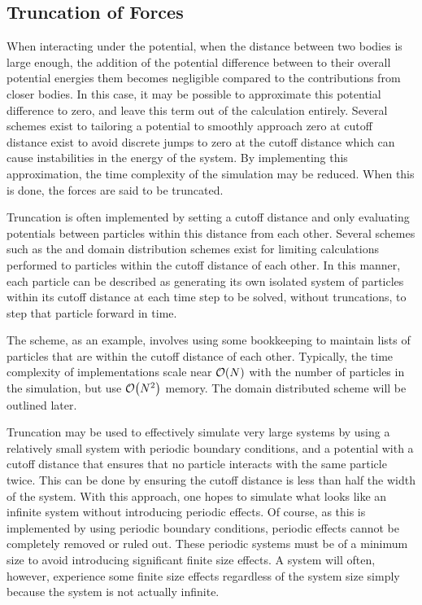 \subsection{Truncation of Forces}

%
When interacting under the \LennardJones{} potential,
when the distance between two bodies is large enough,
the addition of the potential difference between to their overall
potential energies them becomes negligible compared
to the contributions from closer bodies.
%
In this case, it may be possible to approximate this potential difference
to zero, and leave this term out of the calculation entirely.
%
Several schemes exist to tailoring a potential to smoothly approach zero at
cutoff distance exist to avoid discrete jumps to zero at
the cutoff distance which can cause instabilities
in the energy of the system.
%
By implementing this approximation,
the time complexity of the simulation may be reduced.
%
When this is done, the forces are said to be truncated.

%
Truncation is often implemented by
setting a cutoff distance and only evaluating potentials
between particles within this distance from each other.
%
Several schemes such as the \verletlist{} and domain distribution
schemes exist for limiting calculations performed to
particles within the cutoff distance of each other.
%
In this manner, each particle can be described as generating its own
isolated system of particles within its cutoff distance
at each time step
to be solved, without truncations, to step that particle forward in time.

The \verletlist{} scheme, as an example, involves using some bookkeeping to
maintain lists of particles that are within the cutoff distance of each other.
%
Typically, the time complexity of \verletlist{} implementations scale
near $\mathcal{O}{\left({ N }\right)}$ with
the number of particles in the simulation,
but use $\mathcal{O}{\left({ N^2 }\right)}$ memory.
%
The domain distributed scheme will be outlined later.

%
Truncation may be used to effectively simulate very large systems by using
a relatively small system with periodic boundary conditions,
and a potential with a cutoff distance that ensures that
no particle interacts with the same particle twice.
%
This can be done by ensuring the cutoff distance is less than half the width
of the system.
%
With this approach, one hopes to simulate what looks like an infinite system
without introducing periodic effects.
%
Of course, as this is implemented by using periodic boundary conditions,
periodic effects cannot be completely removed or ruled out.
%
These periodic systems must be of a minimum size to avoid introducing
significant finite size effects.
%
A system will often, however, experience some finite size effects
regardless of the system size simply because the system is not actually
infinite.


